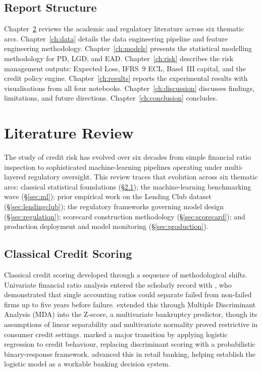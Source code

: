 \documentclass[12pt,a4paper]{report}
\begin{document}
\section{Report Structure}

Chapter~\ref{ch:litreview} reviews the academic and regulatory literature across six thematic arcs. Chapter~\ref{ch:data} details the data engineering pipeline and feature engineering methodology. Chapter~\ref{ch:models} presents the statistical modelling methodology for PD, LGD, and EAD. Chapter~\ref{ch:risk} describes the risk management outputs: Expected Loss, IFRS~9 ECL, Basel~III capital, and the credit policy engine. Chapter~\ref{ch:results} reports the experimental results with visualisations from all four notebooks. Chapter~\ref{ch:discussion} discusses findings, limitations, and future directions. Chapter~\ref{ch:conclusion} concludes.

\chapter{Literature Review}
\label{ch:litreview}

The study of credit risk has evolved over six decades from simple financial ratio inspection to sophisticated machine-learning pipelines operating under multi-layered regulatory oversight. This review traces that evolution across six thematic arcs: classical statistical foundations (\S\ref{sec:classical}); the machine-learning benchmarking wave (\S\ref{sec:ml}); prior empirical work on the Lending Club dataset (\S\ref{sec:lendingclub}); the regulatory frameworks governing model design (\S\ref{sec:regulation}); scorecard construction methodology (\S\ref{sec:scorecard}); and production deployment and model monitoring (\S\ref{sec:production}).

\section{Classical Credit Scoring}
\label{sec:classical}

Classical credit scoring developed through a sequence of methodological shifts. Univariate financial ratio analysis entered the scholarly record with \citet{beaver1966}, who demonstrated that single accounting ratios could separate failed from non-failed firms up to five years before failure. \citet{altman1968} extended this through Multiple Discriminant Analysis (MDA) into the Z-score, a multivariate bankruptcy predictor, though its assumptions of linear separability and multivariate normality proved restrictive in consumer credit settings. \citet{wiginton1980} marked a major transition by applying logistic regression to credit behaviour, replacing discriminant scoring with a probabilistic binary-response framework. \citet{steenackers1989} advanced this in retail banking, helping establish the logistic model as a workable banking decision system.
\end{document}
